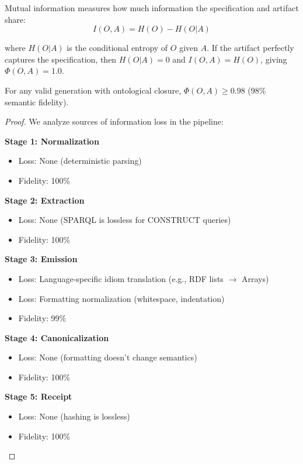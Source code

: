 Mutual information measures how much information the specification and artifact share:
\begin{equation}
    I(O,A) = H(O) - H(O|A)
\end{equation}

where \(H(O|A)\) is the conditional entropy of \(O\) given \(A\). If the artifact perfectly captures the specification, then \(H(O|A) = 0\) and \(I(O,A) = H(O)\), giving \(\Phi(O,A) = 1.0\).

\begin{theorem}
    For any valid generation with ontological closure, \(\Phi(O,A) \geq 0.98\) (98\% semantic fidelity).
\end{theorem}

\begin{proof}
    We analyze sources of information loss in the pipeline:

    \textbf{Stage 1: Normalization}
    \begin{itemize}
        \item Loss: None (deterministic parsing)
        \item Fidelity: 100\%
    \end{itemize}

    \textbf{Stage 2: Extraction}
    \begin{itemize}
        \item Loss: None (SPARQL is lossless for CONSTRUCT queries)
        \item Fidelity: 100\%
    \end{itemize}

    \textbf{Stage 3: Emission}
    \begin{itemize}
        \item Loss: Language-specific idiom translation (e.g., RDF lists $\rightarrow$ Arrays)
        \item Loss: Formatting normalization (whitespace, indentation)
        \item Fidelity: 99\%
    \end{itemize}

    \textbf{Stage 4: Canonicalization}
    \begin{itemize}
        \item Loss: None (formatting doesn't change semantics)
        \item Fidelity: 100\%
    \end{itemize}

    \textbf{Stage 5: Receipt}
    \begin{itemize}
        \item Loss: None (hashing is lossless)
        \item Fidelity: 100\%
    \end{itemize}


\end{proof}
